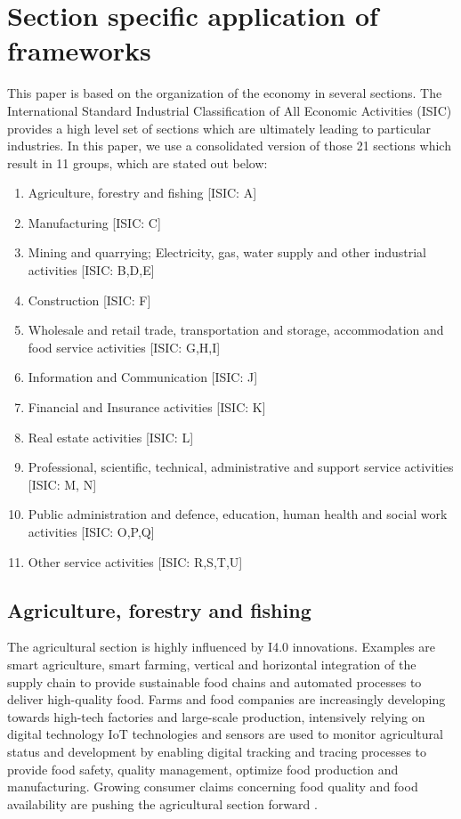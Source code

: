 \section{Section specific application of frameworks}

This paper is based on the organization of the economy in several sections. The International Standard Industrial Classification of All Economic Activities (\ac{ISIC}) provides a high level set of sections which are ultimately leading to particular industries. In this paper, we use a consolidated version of those 21 sections which result in 11 groups, which are stated out below: \cite[p.271, table 4]{ISIC:2008}

\begin{enumerate}
\item Agriculture, forestry and fishing [ISIC: A]
\item Manufacturing [ISIC: C]
\item Mining and quarrying; Electricity, gas, water supply and other industrial activities [ISIC: B,D,E]
\item Construction [ISIC: F]
\item Wholesale and retail trade, transportation and storage, accommodation and food service activities [ISIC: G,H,I]
\item Information and Communication [ISIC: J]
\item Financial and Insurance activities [ISIC: K]
\item Real estate activities [ISIC: L]
\item Professional, scientific, technical, administrative and support service activities [ISIC: M, N]
\item Public administration and defence, education, human health and social work activities [ISIC: O,P,Q]
\item Other service activities [ISIC: R,S,T,U]
\end{enumerate}

\subsection{Agriculture, forestry and fishing}
The agricultural section is highly influenced by \ac{I4.0} innovations. Examples are smart agriculture, smart farming, vertical and horizontal integration of the supply chain to provide sustainable food chains and automated processes to deliver high-quality food. Farms and food companies are increasingly developing towards high-tech factories and large-scale production, intensively relying on digital technology \cite[p.129-151]{FoodAndFarm2020} \ac{IoT} technologies and sensors are used to monitor agricultural status and development by enabling digital tracking and tracing processes to provide food safety, quality management, optimize food production and manufacturing. Growing consumer claims concerning food quality and food availability are pushing the agricultural section forward \cite[p.131]{FoodAndFarm2020}.


